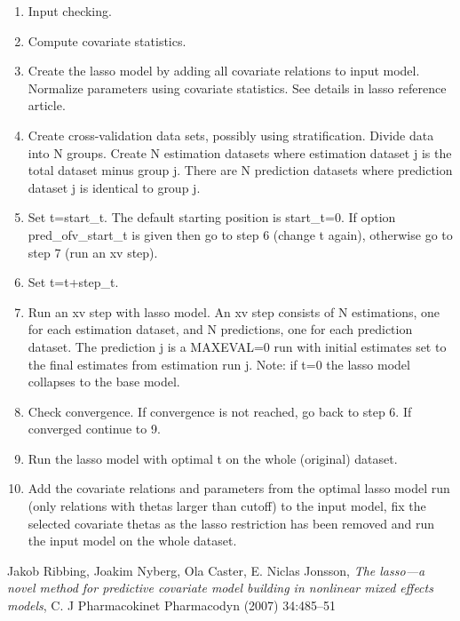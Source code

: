 \begin{enumerate}
\item Input checking.
\item Compute covariate statistics.
\item Create the lasso model by adding all covariate relations to input model. Normalize parameters using covariate statistics. See details in lasso reference article.
\item Create cross-validation data sets, possibly using stratification. Divide data into N groups. Create N estimation datasets where estimation dataset j is the total dataset minus group j. There are N prediction datasets where prediction dataset j is identical to group j. 
\item Set t=start\_t. The default starting position is start\_t=0.
If option pred\_ofv\_start\_t is given then go to step 6 (change t again), otherwise go to step 7 (run an xv step).
\item Set t=t+step\_t. 
\item Run an xv step with lasso model. An xv step consists of N estimations, one for each estimation dataset, and N predictions, one for each prediction dataset. The prediction j is a MAXEVAL=0 run with initial estimates set to the final estimates from estimation run j. Note: if t=0 the lasso model collapses to the base model.
\item Check convergence. If convergence is not reached, go back to step 6. If converged continue to 9.
\item Run the lasso model with optimal t on the whole (original) dataset. 
\item Add the covariate relations and parameters from the optimal lasso model run (only relations with thetas larger than cutoff) to the input model, fix the selected covariate thetas as the lasso restriction has been removed and run the input model on the whole dataset.
\end{enumerate}


\begin{thebibliography}{1}
 Jakob Ribbing, Joakim Nyberg, Ola Caster, E. Niclas Jonsson, {\em The lasso—a novel method for predictive covariate model building in nonlinear mixed effects models}, C. J Pharmacokinet Pharmacodyn (2007) 34:485–51
\end{thebibliography}


